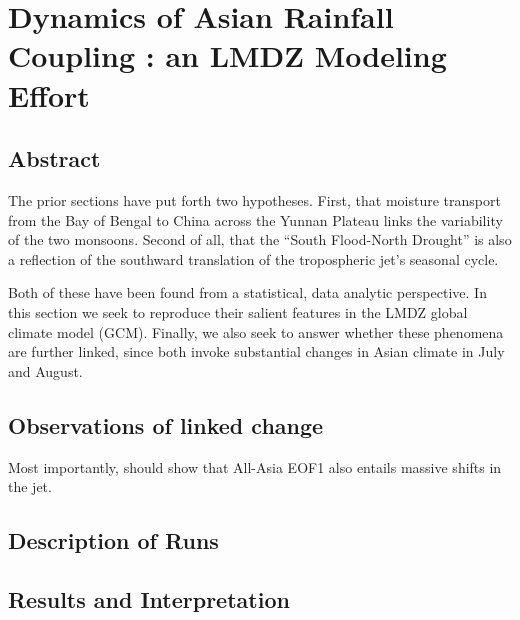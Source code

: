 \chapter{Dynamics of Asian Rainfall Coupling : an LMDZ Modeling Effort}

\section{Abstract}
The prior sections have put forth two hypotheses. First, that moisture transport from the Bay of Bengal to China across the Yunnan Plateau links the variability of the two monsoons. Second of all, that the ``South Flood-North Drought'' is also a reflection of the southward translation of the tropospheric jet's seasonal cycle.

Both of these have been found from a statistical, data analytic perspective. In this section we seek to reproduce their salient features in the LMDZ global climate model (GCM). Finally, we also seek to answer whether these phenomena are further linked, since both invoke substantial changes in Asian climate in July and August.

\section{Observations of linked change}

Most importantly, should show that All-Asia EOF1 also entails massive shifts in the jet.

\section{Description of Runs}

\section{Results and Interpretation}